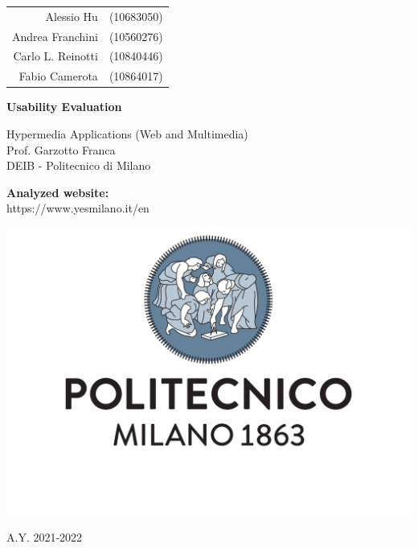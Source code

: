 \documentclass[a4paper]{article}
\begin{document}
\begin{titlepage}
	\centering
    \begin{tabular}{rl}
        Alessio Hu & (10683050) \\
        Andrea Franchini & (10560276) \\ 
        Carlo L. Reinotti & (10840446) \\
        Fabio Camerota & (10864017) \\
    \end{tabular}

    \vspace{1.5cm}
    {\Huge \textbf{Usability Evaluation\\}}
    \vspace{1.5cm}
    {\large 
        Hypermedia Applications (Web and Multimedia) \\
        Prof. Garzotto Franca \\ 
		DEIB - Politecnico di Milano \par
    }
    \vspace{1.5cm}
    {\large \textbf{Analyzed website:}\\
    \vspace{0.5cm}
    https://www.yesmilano.it/en}
    \par
    \vspace{3cm}
    \includegraphics[scale=0.4]{images/logo.pdf}
    \par
    \vspace{3cm}
	A.Y. 2021-2022
    
	
\end{titlepage}

\tableofcontents
    
    
    
    
    \pagebreak
    
    \pagebreak
    
\end{document}
